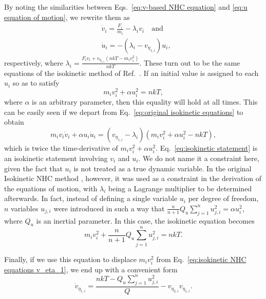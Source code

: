 \documentclass[
aip,
jcp,
reprint,
]{revtex4-1}
\begin{document}
By noting the similarities between Eqs.~\eqref{eq:v-based NHC equation} and \eqref{eq:u equation of motion}, we rewrite them as
\begin{subequations}
\label{eq:original isokinetic equations}
\begin{align}
&\dot{v}_i = \frac{F_i}{m_i} - \lambda_i v_i \quad \mathrm{and} \\
&\dot{u}_i = -(\lambda_i - v_{\eta_{1,i}}) u_i,
\end{align}
\end{subequations}
respectively, where $\lambda_i = \frac{F_i v_i + v_{\eta_{1,i}} (n k T - m_i v_i^2)}{n k T}$.
%
These turn out to be the same equations of the isokinetic method of Ref.~.
If an initial value is assigned to each $u_i$ so as to satisfy
\begin{equation}
\label{eq:isokinetic statement}
m_i v_i^2 + \alpha u_i^2 = n kT,
\end{equation}
where $\alpha$ is an arbitrary parameter, then this equality will hold at all times.
This can be easily seen if we depart from Eq.~\eqref{eq:original isokinetic equations} to obtain
\begin{equation*}
m_i v_i \dot{v}_i + \alpha u_i \dot{u}_i = (v_{\eta_{1,i}} - \lambda_i)(m_i v_i^2 + \alpha u_i^2 - n k T),
\end{equation*}
which is twice the time-derivative of $m_i v_i^2 + \alpha u_i^2$.
Eq.~\eqref{eq:isokinetic statement} is an isokinetic statement involving $v_i$ and $u_i$.
We do not name it a constraint here, given the fact that $u_i$ is not treated as a true dynamic variable.
In the original Isokinetic NHC method \cite{Minary_2004}, however, it was used as a constraint in the derivation of the equations of motion, with $\lambda_i$ being a Lagrange multiplier to be determined afterwards.
In fact, instead of defining a single variable $u_i$ per degree of freedom, $n$ variables $u_{j, i}$ were introduced in such a way that $\frac{n}{n+1} Q_u \sum_{j=1}^n u_{j, i}^2 = \alpha u_i^2$, where $Q_u$ is an inertial parameter.
In this case, the isokinetic equation becomes
\begin{equation}
m_i v_i^2 + \frac{n}{n+1} Q_u \sum_{j=1}^n u_{j, i}^2 = n kT.
\end{equation}

Finally, if we use this equation to displace $m_i v_i^2$ from Eq.~\eqref{eq:isokinetic NHC equations v_eta_1}, we end up with a convenient form
\begin{equation}
\dot{v}_{\eta_{1, i}} = \frac{nkT - Q_u \sum_{j=1}^n u_{j, i}^2}{Q} - v_{\eta_{2, i}} v_{\eta_{1, i}}.
\end{equation}
\end{document}
